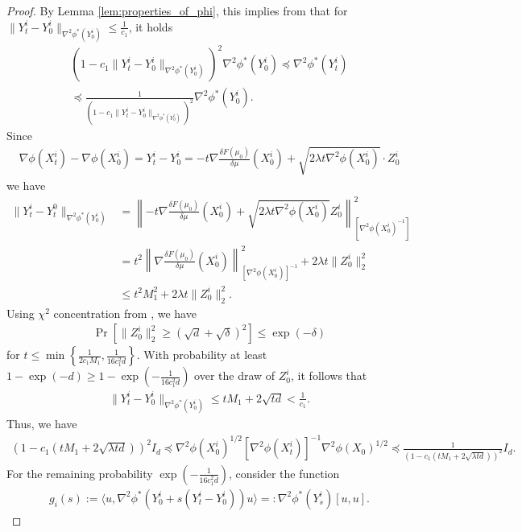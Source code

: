 \documentclass{article}
\begin{document}
\begin{proof}
    By Lemma \ref{lem:properties_of_phi}, this implies from \citet{nesterov1994interior} that for $\|Y_t^i - Y_0^i\|_{\nabla^2\phi^*(Y_0^i)}\le \frac{1}{c_1}$, it holds
    \begin{align*}
    (1-c_1\|Y_t^i - Y_0^i\|_{\nabla^2\phi^*(Y_0^i)})^2\nabla^2\phi^*(Y_0^i)\preceq \nabla^2\phi^*(Y_t^i)\\
    \preceq \frac{1}{(1-c_1\|Y_t^i - Y_0^i\|_{\nabla^2\phi^*(Y_0^i)})^2}\nabla^2\phi^*(Y_0^i).
    \end{align*}
Since
\begin{align*}
\nabla\phi(X_t^i)-\nabla\phi(X_0^i) = Y_t^i - Y_0^i = -t\nabla \frac{\delta F(\mu_0)}{\delta\mu}(X_0^i) + \sqrt{2\lambda t\nabla^2\phi(X_0^i)}\cdot Z_0^i
\end{align*}
we have \begin{align*}
    \|Y_t^i-Y_t^0\|_{\nabla^2\phi^*(Y_0^i)} &= \left\|-t \nabla \frac{\delta F(\mu_0)}{\delta\mu}(X_0^i) + \sqrt{2\lambda t\nabla^2\phi(X_0^i)}Z_0^i\right\|^2_{[\nabla^2\phi(X_0^i)^{-1}]}\\
    &= t^2 \left\|\nabla\frac{\delta F(\mu_0)}{\delta \mu}(X_0^i)\right\|^2_{[\nabla^2\phi(X_0^i)]^{-1}} + 2\lambda t \|Z_0^i\|_2^2\\
    &\le t^2M_1^2  + 2\lambda t\|Z_0^i\|_2^2.
\end{align*}
Using $\chi^2$ concentration from \citet{Laurent2000AdaptiveEO}, we have
\begin{align*}
\Pr[\|Z_0^i\|_2^2\ge (\sqrt{d} + \sqrt{\delta})^2]\le \exp(-\delta)
\end{align*}
for $t\le \min \left\{\frac{1}{2c_1M_1}, \frac{1}{16c_1^2d}\right\}$. With probability at least $1 - \exp(-d)\ge 1 - \exp\left(-\frac{1}{16c_1^2d}\right)$ over the draw of $Z_0^i$, it follows that
\begin{align*}
\|Y_t^i - Y_0^i\|_{\nabla^2\phi^*(Y_0^i)}\le tM_1 + 2\sqrt{td}< \frac{1}{c_1}.
\end{align*}
Thus, we have
\begin{align*}
(1-c_1(tM_1 + 2\sqrt{\lambda td}))^2I_d\preceq \nabla^2\phi(X_0^i)^{1/2}[\nabla^2\phi(X_t^i)]^{-1}\nabla^2\phi(X_0)^{1/2}
\preceq \frac{1}{(1-c_1(tM_1 + 2\sqrt{\lambda td}))^2}I_d.
\end{align*}
For the remaining probability $\exp\left(-\frac{1}{16c_1^2d}\right)$, consider the function
\begin{align*}
g_i(s) := \langle u, \nabla^2\phi^*(Y_0^i + s(Y_t^i - Y_0^i))u\rangle =: \nabla^2\phi^*(Y_s^i)[u,u].
\end{align*}

\end{proof}
\end{document}
